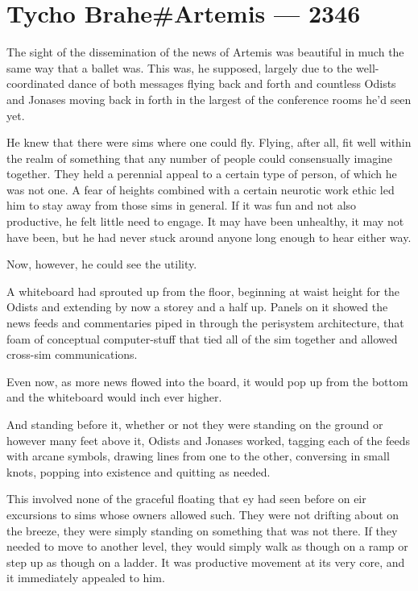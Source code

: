 \hypertarget{tycho-braheartemis-2346}{%
\chapter{Tycho Brahe\#Artemis — 2346}\label{tycho-braheartemis-2346}}

The sight of the dissemination of the news of Artemis was beautiful in much the same way that a ballet was. This was, he supposed, largely due to the well-coordinated dance of both messages flying back and forth and countless Odists and Jonases moving back in forth in the largest of the conference rooms he'd seen yet.

He knew that there were sims where one could fly. Flying, after all, fit well within the realm of something that any number of people could consensually imagine together. They held a perennial appeal to a certain type of person, of which he was not one. A fear of heights combined with a certain neurotic work ethic led him to stay away from those sims in general. If it was fun and not also productive, he felt little need to engage. It may have been unhealthy, it may not have been, but he had never stuck around anyone long enough to hear either way.

Now, however, he could see the utility.

A whiteboard had sprouted up from the floor, beginning at waist height for the Odists and extending by now a storey and a half up. Panels on it showed the news feeds and commentaries piped in through the perisystem architecture, that foam of conceptual computer-stuff that tied all of the sim together and allowed cross-sim communications.

Even now, as more news flowed into the board, it would pop up from the bottom and the whiteboard would inch ever higher.

And standing before it, whether or not they were standing on the ground or however many feet above it, Odists and Jonases worked, tagging each of the feeds with arcane symbols, drawing lines from one to the other, conversing in small knots, popping into existence and quitting as needed.

This involved none of the graceful floating that ey had seen before on eir excursions to sims whose owners allowed such. They were not drifting about on the breeze, they were simply standing on something that was not there. If they needed to move to another level, they would simply walk as though on a ramp or step up as though on a ladder. It was productive movement at its very core, and it immediately appealed to him.


